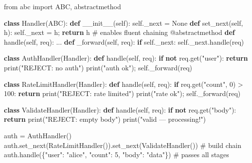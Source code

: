 \documentclass[11pt]{article}
\newenvironment{Shaded}{\begin{snugshade}}{\end{snugshade}}
\newcommand{\AttributeTok}[1]{\textcolor[rgb]{0.16,0.50,0.73}{#1}}
\newcommand{\BuiltInTok}[1]{\textcolor[rgb]{0.50,0.55,0.55}{#1}}
\newcommand{\CommentTok}[1]{\textcolor[rgb]{0.48,0.49,0.49}{#1}}
\newcommand{\ControlFlowTok}[1]{\textcolor[rgb]{0.99,0.74,0.29}{\textbf{#1}}}
\newcommand{\DecValTok}[1]{\textcolor[rgb]{0.96,0.45,0.00}{#1}}
\newcommand{\FunctionTok}[1]{\textcolor[rgb]{0.56,0.27,0.68}{#1}}
\newcommand{\ImportTok}[1]{\textcolor[rgb]{0.15,0.68,0.38}{#1}}
\newcommand{\KeywordTok}[1]{\textcolor[rgb]{0.81,0.81,0.76}{\textbf{#1}}}
\newcommand{\NormalTok}[1]{\textcolor[rgb]{0.81,0.81,0.76}{#1}}
\newcommand{\OperatorTok}[1]{\textcolor[rgb]{0.81,0.81,0.76}{#1}}
\newcommand{\StringTok}[1]{\textcolor[rgb]{0.96,0.31,0.31}{#1}}
\newcommand{\VariableTok}[1]{\textcolor[rgb]{0.15,0.68,0.68}{#1}}
\begin{document}
\begin{Shaded}
\begin{Highlighting}[]
\ImportTok{from}\NormalTok{ abc }\ImportTok{import}\NormalTok{ ABC, abstractmethod}

\KeywordTok{class}\NormalTok{ Handler(ABC):}
    \KeywordTok{def} \FunctionTok{\_\_init\_\_}\NormalTok{(}\VariableTok{self}\NormalTok{): }\VariableTok{self}\NormalTok{.\_next }\OperatorTok{=} \VariableTok{None}
    \KeywordTok{def}\NormalTok{ set\_next(}\VariableTok{self}\NormalTok{, h):}
        \VariableTok{self}\NormalTok{.\_next }\OperatorTok{=}\NormalTok{ h}\OperatorTok{;} \ControlFlowTok{return}\NormalTok{ h            }\CommentTok{\# enables fluent chaining}
    \AttributeTok{@abstractmethod}
    \KeywordTok{def}\NormalTok{ handle(}\VariableTok{self}\NormalTok{, req): ...}
    \KeywordTok{def}\NormalTok{ \_forward(}\VariableTok{self}\NormalTok{, req):}
        \ControlFlowTok{if} \VariableTok{self}\NormalTok{.\_next: }\VariableTok{self}\NormalTok{.\_next.handle(req)}

\KeywordTok{class}\NormalTok{ AuthHandler(Handler):}
    \KeywordTok{def}\NormalTok{ handle(}\VariableTok{self}\NormalTok{, req):}
        \ControlFlowTok{if} \KeywordTok{not}\NormalTok{ req.get(}\StringTok{"user"}\NormalTok{): }\ControlFlowTok{return} \BuiltInTok{print}\NormalTok{(}\StringTok{"REJECT: no auth"}\NormalTok{)}
        \BuiltInTok{print}\NormalTok{(}\StringTok{"auth ok"}\NormalTok{)}\OperatorTok{;} \VariableTok{self}\NormalTok{.\_forward(req)}

\KeywordTok{class}\NormalTok{ RateLimitHandler(Handler):}
    \KeywordTok{def}\NormalTok{ handle(}\VariableTok{self}\NormalTok{, req):}
        \ControlFlowTok{if}\NormalTok{ req.get(}\StringTok{"count"}\NormalTok{, }\DecValTok{0}\NormalTok{) }\OperatorTok{\textgreater{}} \DecValTok{100}\NormalTok{: }\ControlFlowTok{return} \BuiltInTok{print}\NormalTok{(}\StringTok{"REJECT: rate limited"}\NormalTok{)}
        \BuiltInTok{print}\NormalTok{(}\StringTok{"rate ok"}\NormalTok{)}\OperatorTok{;} \VariableTok{self}\NormalTok{.\_forward(req)}

\KeywordTok{class}\NormalTok{ ValidateHandler(Handler):}
    \KeywordTok{def}\NormalTok{ handle(}\VariableTok{self}\NormalTok{, req):}
        \ControlFlowTok{if} \KeywordTok{not}\NormalTok{ req.get(}\StringTok{"body"}\NormalTok{): }\ControlFlowTok{return} \BuiltInTok{print}\NormalTok{(}\StringTok{"REJECT: empty body"}\NormalTok{)}
        \BuiltInTok{print}\NormalTok{(}\StringTok{"valid — processing!"}\NormalTok{)}

\NormalTok{auth }\OperatorTok{=}\NormalTok{ AuthHandler()}
\NormalTok{auth.set\_next(RateLimitHandler()).set\_next(ValidateHandler())   }\CommentTok{\# build chain}
\NormalTok{auth.handle(\{}\StringTok{"user"}\NormalTok{: }\StringTok{"alice"}\NormalTok{, }\StringTok{"count"}\NormalTok{: }\DecValTok{5}\NormalTok{, }\StringTok{"body"}\NormalTok{: }\StringTok{"data"}\NormalTok{\})      }\CommentTok{\# passes all stages}
\end{Highlighting}
\end{Shaded}
\end{document}
